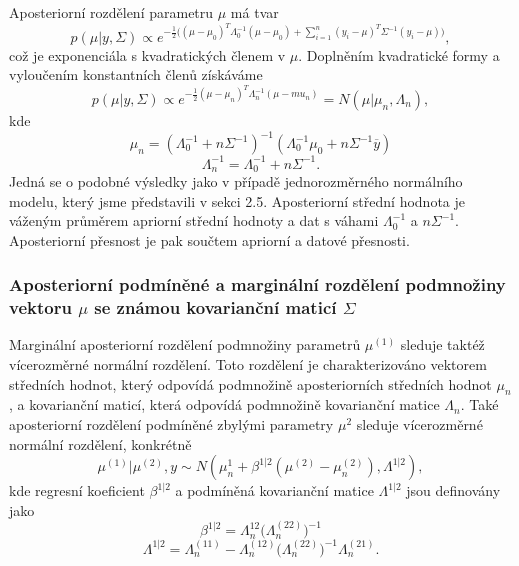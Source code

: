 Aposteriorní rozdělení parametru $\mu$ má tvar
\begin{equation}
p(\mu| y, \Sigma) \varpropto e^{-\frac{1}{2}\Big((\mu - \mu_0)^T \Lambda_0^{-1}(\mu - \mu_0) + \sum_{i = 1}^n (y_i - \mu)^T \Sigma^{-1}(y_i - \mu) \Big)},
\end{equation}
což je exponenciála s kvadratických členem v $\mu$. Doplněním kvadratické formy a vyloučením konstantních členů získáváme
\begin{equation}
p(\mu| y, \Sigma) \varpropto e^{-\frac{1}{2}(\mu - \mu_n)^T \Lambda_n^{-1}(\mu - mu_n)} = N(\mu | \mu_n, \Lambda_n),
\end{equation}
kde
\begin{equation}
\mu_n = (\Lambda_0^{-1} + n \Sigma^{-1})^{-1}(\Lambda_0^{-1}\mu_0 + n \Sigma^{-1}\overline{y})
\end{equation}
\begin{equation}
\Lambda_n^{-1} = \Lambda_0^{-1} + n \Sigma^{-1}.
\end{equation}
Jedná se o podobné výsledky jako v případě jednorozměrného normálního modelu, který jsme představili v sekci 2.5. Aposteriorní střední hodnota je váženým průměrem apriorní střední hodnoty a dat s váhami $\Lambda_0^{-1}$ a $n\Sigma^{-1}$. Aposteriorní přesnost je pak součtem apriorní a datové přesnosti.

\subsubsection{Aposteriorní podmíněné a marginální rozdělení podmnožiny vektoru $\mu$ se známou kovarianční maticí $\Sigma$}

Marginální aposteriorní rozdělení podmnožiny parametrů $\mu^{(1)}$ sleduje taktéž vícerozměrné normální rozdělení. Toto rozdělení je charakterizováno vektorem středních hodnot, který odpovídá podmnožině aposteriorních středních hodnot $\mu_n$, a kovarianční maticí, která odpovídá podmnožině kovarianční matice $\Lambda_n$. Také aposteriorní rozdělení podmíněné zbylými parametry $\mu^{2}$ sleduje vícerozměrné normální rozdělení, konkrétně
\begin{equation}
\mu^{(1)} | \mu^{(2)}, y \sim N(\mu_n^{1} + \beta^{1 | 2}(\mu^{(2)} - \mu_n^{(2)}), \Lambda^{1|2}),
\end{equation}
kde regresní koeficient $\beta^{1|2}$ a podmíněná kovarianční matice $\Lambda^{1 | 2}$ jsou definovány jako
\begin{equation}
\beta^{1|2} = \Lambda_n^{12}\Big(\Lambda_n^{(22)}\Big)^{-1}
\end{equation}
\begin{equation}
\Lambda^{1 | 2} = \Lambda_n^{(11)} - \Lambda_n^{(12)} \Big(\Lambda_n^{(22)}\Big)^{-1}\Lambda_n^{(21)}.
\end{equation}

